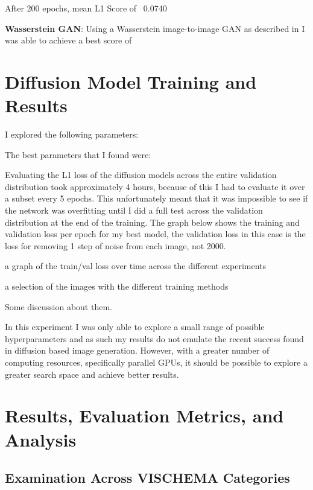 \documentclass{UoYCSproject}
\begin{document}
After 200 epochs, mean L1 Score of ~0.0740


\textbf{Wasserstein GAN}: Using a Wasserstein image-to-image GAN as described in \cite{pix2pixwasserstein} I was able to achieve a best score of

\section{Diffusion Model Training and Results}

I explored the following parameters:

The best parameters that I found were: 

Evaluating the L1 loss of the diffusion models across the entire validation distribution took approximately 4 hours, because of this I had to evaluate it over a subset every 5 epochs. This unfortunately meant that it was impossible to see if the network was overfitting until I did a full test across the validation distribution at the end of the training. The graph below shows the training and validation loss per epoch for my best model, the validation loss in this case is the loss for removing 1 step of noise from each image, not 2000.

a graph of the train/val loss over time across the different experiments



a selection of the images with the different training methods


Some discussion about them.

In this experiment I was only able to explore a small range of possible hyperparameters and as such my results do not emulate the recent success found in diffusion based image generation. \cite{ramesh2022hierarchical, saharia2022photorealistic} However, with a greater number of computing resources, specifically parallel GPUs, it should be possible to explore a greater search space and achieve better results.

\section{Results, Evaluation Metrics, and Analysis}

\subsection{Examination Across VISCHEMA Categories}
\end{document}
